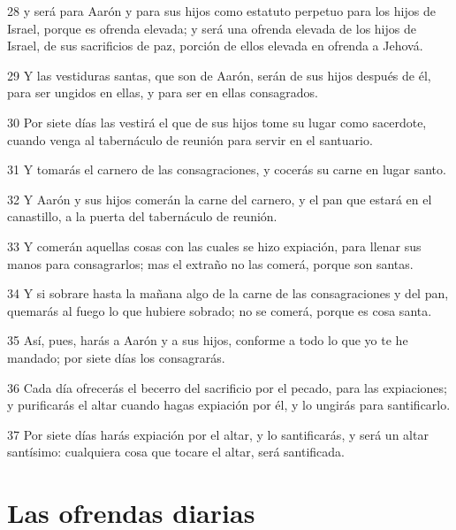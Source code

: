 \par 28 y será para Aarón y para sus hijos como estatuto perpetuo para los hijos de Israel, porque es ofrenda elevada; y será una ofrenda elevada de los hijos de Israel, de sus sacrificios de paz, porción de ellos elevada en ofrenda a Jehová.
\par 29 Y las vestiduras santas, que son de Aarón, serán de sus hijos después de él, para ser ungidos en ellas, y para ser en ellas consagrados.
\par 30 Por siete días las vestirá el que de sus hijos tome su lugar como sacerdote, cuando venga al tabernáculo de reunión para servir en el santuario.
\par 31 Y tomarás el carnero de las consagraciones, y cocerás su carne en lugar santo.
\par 32 Y Aarón y sus hijos comerán la carne del carnero, y el pan que estará en el canastillo, a la puerta del tabernáculo de reunión.
\par 33 Y comerán aquellas cosas con las cuales se hizo expiación, para llenar sus manos para consagrarlos; mas el extraño no las comerá, porque son santas.
\par 34 Y si sobrare hasta la mañana algo de la carne de las consagraciones y del pan, quemarás al fuego lo que hubiere sobrado; no se comerá, porque es cosa santa.
\par 35 Así, pues, harás a Aarón y a sus hijos, conforme a todo lo que yo te he mandado; por siete días los consagrarás.
\par 36 Cada día ofrecerás el becerro del sacrificio por el pecado, para las expiaciones; y purificarás el altar cuando hagas expiación por él, y lo ungirás para santificarlo.
\par 37 Por siete días harás expiación por el altar, y lo santificarás, y será un altar santísimo: cualquiera cosa que tocare el altar, será santificada.

\section*{Las ofrendas diarias}

